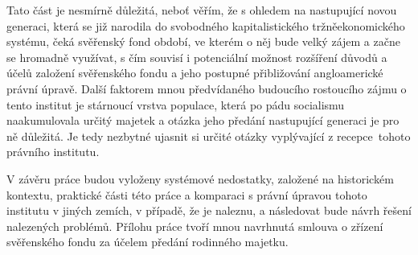 \documentclass{article}
\begin{document}
\indent Tato část je nesmírně důležitá, neboť věřím, že s ohledem na nastupující novou generaci, která se již narodila do svobodného kapitalistického tržněeko\-nomického systému, čeká svěřenský fond období, ve kterém o něj bude velký zájem a začne se hromadně využívat, s čím souvisí i potenciální možnost rozšíření důvodů a účelů založení svěřenského fondu a jeho postupné přibližování angloamerické právní úpravě. Další faktorem mnou předvídaného budoucího rostoucího zájmu o tento institut je stárnoucí vrstva populace, která po pádu soci\-alismu naakumulovala určitý majetek a otázka jeho předání nastupující generaci je pro ně důležitá. Je tedy nezbytné ujasnit si určité otázky vyplývající z recepce\ tohoto právního institutu. \\
\linebreak

\indent V závěru práce budou vyloženy systémové nedostatky, založené na historickém kontextu, praktické části této práce a komparaci s právní úpravou tohoto institutu v jiných zemích, v případě, že je naleznu, a následovat bude návrh řešení nalezených problémů. Přílohu práce tvoří mnou navrhnutá smlouva o zřízení svěřenského fondu za účelem předání rodinného majetku.




\end{document}
